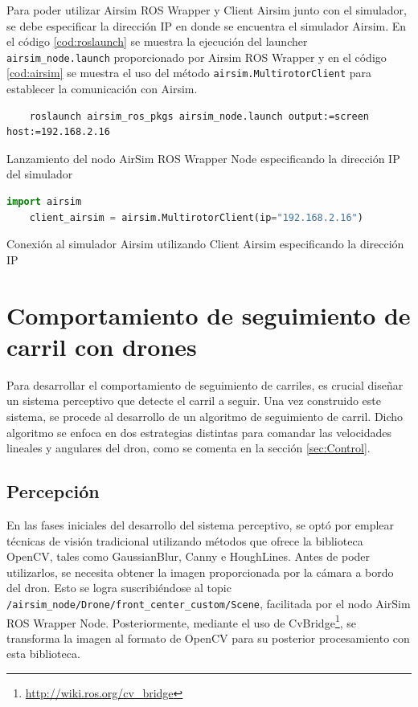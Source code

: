 Para poder utilizar Airsim ROS Wrapper y Client Airsim junto con el simulador, se debe especificar la dirección IP en donde se encuentra el simulador Airsim. En el código 
\ref{cod:roslaunch} se muestra la ejecución del launcher \texttt{airsim\_node.launch} proporcionado por Airsim ROS Wrapper y en el código \ref{cod:airsim} se muestra el uso del método
\texttt{airsim.MultirotorClient}
para establecer la comunicación con Airsim. \newline

\begin{code}  [H]
  \begin{lstlisting}
    roslaunch airsim_ros_pkgs airsim_node.launch output:=screen host:=192.168.2.16
  \end{lstlisting}
  \caption[comando]{Lanzamiento del nodo AirSim ROS Wrapper Node especificando la dirección IP del simulador}
  \label{cod:roslaunch}
\end{code} 

\begin{code}  [H]
  \begin{lstlisting}[language=Python]
    import airsim
    client_airsim = airsim.MultirotorClient(ip="192.168.2.16")
  \end{lstlisting}
  \caption[comando]{Conexión al simulador Airsim utilizando Client Airsim especificando la dirección IP}
  \label{cod:airsim}
\end{code} 



\section{Comportamiento de seguimiento de carril con drones}
\label{sec:Comportamiento de seguimiento de carril con drones}
Para desarrollar el comportamiento de seguimiento de carriles, es crucial diseñar un sistema perceptivo que detecte el carril a seguir. Una vez 
construido este sistema, se procede al desarrollo de un algoritmo de seguimiento de carril. Dicho algoritmo se enfoca en dos estrategias distintas 
para comandar las velocidades lineales y angulares del dron, como se comenta en la sección \ref{sec:Control}. 
\subsection{Percepción}
\label{sec:Percepción}

En las fases iniciales del desarrollo del sistema perceptivo, se optó por emplear técnicas de visión tradicional utilizando métodos que ofrece la biblioteca 
OpenCV, tales como GaussianBlur, Canny e HoughLines. Antes de poder utilizarlos, se necesita obtener la imagen proporcionada por la cámara a bordo del dron. Esto se logra
suscribiéndose al topic \texttt{/airsim\_node/Drone/front\_center\_custom/Scene}, facilitada por el nodo AirSim ROS Wrapper Node. Posteriormente, mediante el uso de 
CvBridge\footnote{\url{http://wiki.ros.org/cv_bridge}}, se transforma la imagen al formato de OpenCV para su posterior procesamiento con esta biblioteca. \newline

